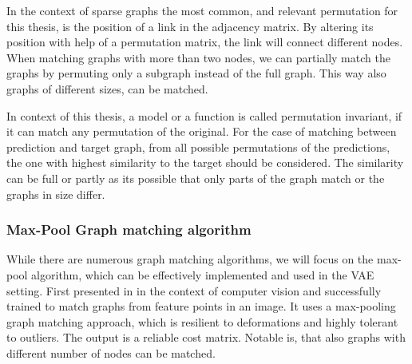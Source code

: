 {In the context of sparse graphs the most common, and relevant permutation for this thesis, is the position of a link in the adjacency matrix. By altering its position with help of a permutation matrix, the link will connect different nodes. When matching graphs with more than two nodes, we can partially match the graphs by permuting only a subgraph instead of the full graph. This way also graphs of different sizes, can be matched. 

In context of this thesis, a model or a function is called permutation invariant, if it can match any permutation of the original. For the case of matching between prediction and target graph, from all possible permutations of the predictions, the one with highest similarity to the target should be considered. The similarity can be full or partly as its possible that only parts of the graph match or the graphs in size differ.  



\subsubsection{Max-Pool Graph matching algorithm}


While there are numerous graph matching algorithms, we will focus on the max-pool algorithm, which can be effectively implemented and used in the VAE setting. First presented in \cite{cho_finding_2014} in the context of computer vision and successfully trained to match graphs from feature points in an image. It uses a max-pooling graph matching approach, which is resilient to deformations and highly tolerant to outliers. The output is a reliable cost matrix. Notable is, that also graphs with different number of nodes can be matched.


}
